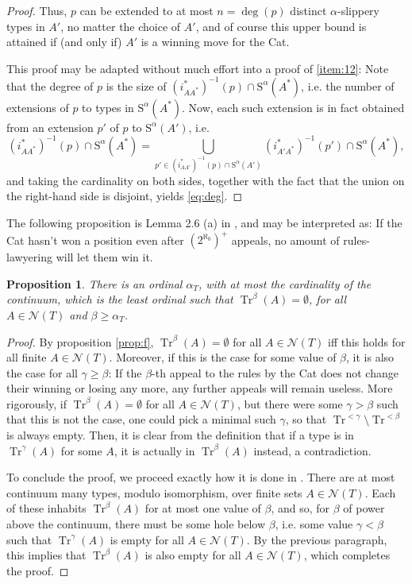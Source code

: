 \documentclass{article}
\newtheorem{prop}[theorem]{Proposition}
\theoremstyle{nonumberplain}
\newtheorem{proof}{Proof}
\newcommand{\calN}{\mathcal{N}}
\newcommand{\Stone}{\mathrm{S}}
\DeclareMathOperator{\Tr}{Tr}
\begin{document}
\begin{proof}
Thus, $p$ can be extended to at most $n = \deg(p)$ distinct $\alpha$-slippery types in $A'$, no matter the choice of $A'$, and of course this upper bound is attained if (and only if) $A'$ is a winning move for the Cat.

This proof may be adapted without much effort into a proof of \ref{item:12}: Note that the degree of $p$ is the size of $(i_{AA^*}^*)^{-1}(p) \cap \Stone^\alpha(A^*)$, i.e. the number of extensions of $p$ to types in $\Stone^\alpha(A^*)$. Now, each such extension is in fact obtained from an extension $p'$ of $p$ to $\Stone^\alpha(A')$, i.e.
\begin{equation}
(i_{AA^*}^*)^{-1}(p) \cap \Stone^\alpha(A^*) = \bigcup_{p' \in (i_{AA'}^*)^{-1}(p) \cap \Stone^\alpha(A') } (i_{A'A^*}^*)^{-1}(p') \cap \Stone^\alpha(A^*),
\end{equation}
and taking the cardinality on both sides, together with the fact that the union on the right-hand side is disjoint, yields \eqref{eq:deg}.
\end{proof}

The following proposition is Lemma 2.6 (a) in \cite{morley}, and may be interpreted as: If the Cat hasn't won a position even after $(2^{\aleph_0})^+$ appeals, no amount of rules-lawyering will let them win it.

\begin{prop}
There is an ordinal $\alpha_T$, with at most the cardinality of the continuum, which is the least ordinal such that $\Tr^\beta(A) = \emptyset$, for all $A \in \calN(T)$ and $\beta \geq \alpha_T$.
\end{prop}

\begin{proof}
By proposition \ref{prop:f}, $\Tr^\beta(A) = \emptyset$ for all $A \in \calN(T)$ iff this holds for all finite $A \in \calN(T)$. Moreover, if this is the case for some value of $\beta$, it is also the case for all $\gamma \geq \beta$: If the $\beta$-th appeal to the rules by the Cat does not change their winning or losing any more, any further appeals will remain useless. More rigorously, if $\Tr^\beta(A) = \emptyset$ for all $A \in \calN(T)$, but there were some $\gamma > \beta$ such that this is not the case, one could pick a minimal such $\gamma$, so that $\Tr^{<\gamma} \setminus \Tr^{<\beta}$ is always empty. Then, it is clear from the definition that if a type is in $\Tr^\gamma(A)$ for some $A$, it is actually in $\Tr^\beta(A)$ instead, a contradiction.

To conclude the proof, we proceed exactly how it is done in \cite{morley}. There are at most continuum many types, modulo isomorphism, over finite sets $A \in \calN(T)$. Each of these inhabits $\Tr^\beta(A)$ for at most one value of $\beta$, and so, for $\beta$ of power above the continuum, there must be some hole below $\beta$, i.e. some value $\gamma < \beta$ such that $\Tr^\gamma(A)$ is empty for all $A \in \calN(T)$. By the previous paragraph, this implies that $\Tr^\beta(A)$ is also empty for all $A \in \calN(T)$, which completes the proof.
\end{proof}
\end{document}
